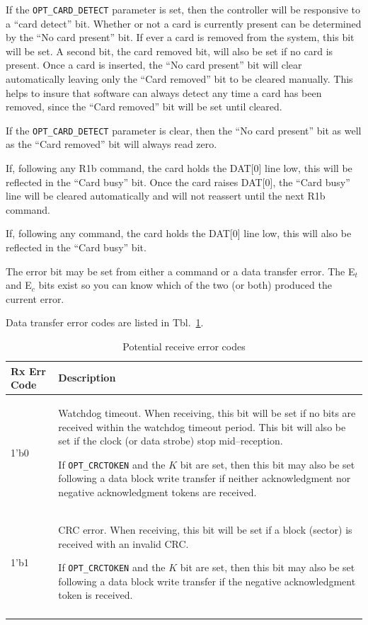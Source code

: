 \documentclass{gqtekspec}
\begin{document}
If the {\tt OPT\_CARD\_DETECT} parameter is set, then the controller will be
responsive to a ``card detect'' bit.  Whether or not a card is currently
present can be determined by the ``No card present'' bit.  If ever a card is
removed from the system, this bit will be set.  A second bit, the card removed
bit, will also be set if no card is present.  Once a card is inserted, the
``No card present'' bit will clear automatically leaving only the ``Card
removed'' bit to be cleared manually.  This helps to insure that software
can always detect any time a card has been removed, since the ``Card removed''
bit will be set until cleared.

If the {\tt OPT\_CARD\_DETECT} parameter is clear, then the ``No card present''
bit as well as the ``Card removed'' bit will always read zero.

If, following any R1b command, the card holds the DAT[0] line low, this will be
reflected in the ``Card busy'' bit.  Once the card raises DAT[0], the
``Card busy'' line will be cleared automatically and will not reassert until
the next R1b command.

If, following any command, the card holds the DAT[0] line low, this will also
be reflected in the ``Card busy'' bit.

The error bit may be set from either a command or a data transfer error.
The E$_t$ and E$_c$ bits exist so you can know which of the two (or both)
produced the current error.

Data transfer error codes are listed in Tbl.~\ref{tbl:CMD-RXECODE}.
\begin{table}\begin{center}
\begin{tabular}{|p{1.2in}|p{4.0in}|}\hline
	\rowcolor[gray]{0.85} Rx Err Code & Description\\\hline\hline
1'b0 & Watchdog timeout.  When receiving, this bit will be set if no bits are
	received within the watchdog timeout period.  This bit will also be
	set if the clock (or data strobe) stop mid--reception.

	If {\tt OPT\_CRCTOKEN} and the $K$ bit are set, then this bit may also
	be set following a data block write transfer if neither acknowledgment
	nor negative acknowledgment tokens are received.\\
1'b1 & CRC error.  When receiving, this bit will be set if a block (sector) is
	received with an invalid CRC.

	If {\tt OPT\_CRCTOKEN} and the $K$ bit are set, then this bit may also
	be set following a data block write transfer if the negative
	acknowledgment token is received.\\
	\\\hline
\end{tabular}
\caption{Potential receive error codes}\label{tbl:CMD-RXECODE}
\end{center}\end{table}
\end{document}

